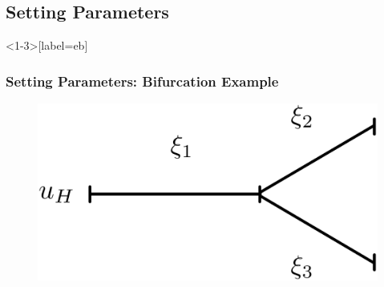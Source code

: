 \documentclass[compress]{beamer}
\begin{document}
\subsection{Setting Parameters}

\begin{frame}<1-3>[label=eb]
	\frametitle{Setting Parameters: Bifurcation Example}
	\begin{figure}
		\begin{center}
			\begin{minipage}[t][0.33\paperheight][t]{\textwidth}
				\begin{minipage}{0.44\textwidth}
					\includegraphics[width=\textwidth]{images/bifurcation_1D.eps}
				\end{minipage}
\end{minipage}
\end{center}
\end{figure}
\end{frame}
\end{document}
